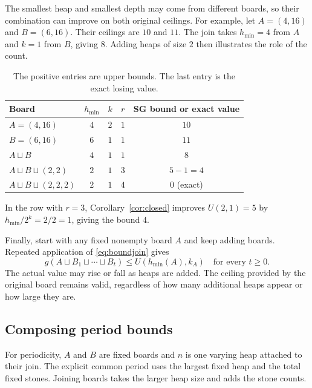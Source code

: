 \documentclass[10pt,a4paper]{article}
\newcommand{\join}{\sqcup}
\begin{document}
The smallest heap and smallest depth may come from different boards,
so their combination can improve on both original ceilings. For
example, let $A=(4,16)$ and $B=(6,16)$. Their ceilings are $10$ and
$11$. The join takes $h_{\min}=4$ from $A$ and $k=1$ from $B$, giving $8$.
Adding heaps of size $2$ then illustrates the role of the count.

\begin{table}[H]
\centering\small
\begin{tabular}{@{}lcccc@{}}
\toprule
Board & $h_{\min}$ & $k$ & $r$ & SG bound or exact value\\
\midrule
$A=(4,16)$ & $4$ & $2$ & $1$ & $10$\\
$B=(6,16)$ & $6$ & $1$ & $1$ & $11$\\
$A\join B$ & $4$ & $1$ & $1$ & $8$\\
$A\join B\join(2,2)$ & $2$ & $1$ & $3$ & $5-1=4$\\
$A\join B\join(2,2,2)$ & $2$ & $1$ & $4$ & $0$ (exact)\\
\bottomrule
\end{tabular}
\caption{The positive entries are upper bounds. The last entry is
the exact losing value.}
\label{tab:joinexample}
\end{table}

In the row with $r=3$, Corollary~\ref{cor:closed} improves
$U(2,1)=5$ by $h_{\min}/2^k=2/2=1$, giving the bound $4$.

Finally, start with any fixed nonempty board $A$ and keep adding
boards. Repeated application of \eqref{eq:boundjoin} gives
\begin{equation}
 \boxed{g(A\join B_1\join\cdots\join B_t)\le U(h_{\min}(A),k_A)
 \quad\text{for every }t\ge0.}
 \label{eq:forever}
\end{equation}
The actual value may rise or fall as heaps are added. The ceiling
provided by the original board remains valid, regardless of how
many additional heaps appear or how large they are.

\subsection{Composing period bounds}

For periodicity, $A$ and $B$ are fixed boards and $n$ is one
varying heap attached to their join. The explicit common period
uses the largest fixed heap and the total fixed stones. Joining
boards takes the larger heap size and adds the stone counts.
\end{document}
